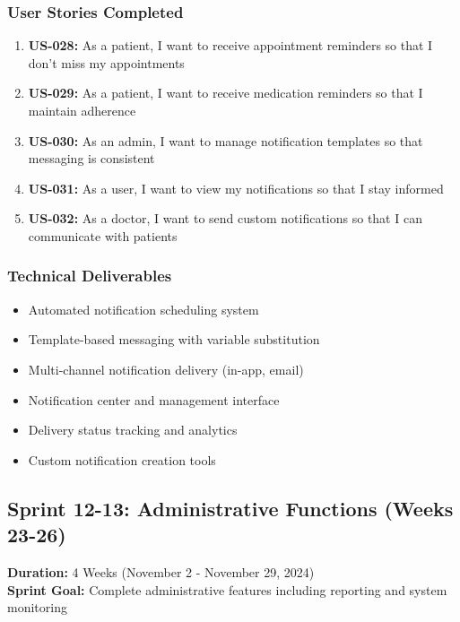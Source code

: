 \documentclass[12pt,a4paper]{article}
\begin{document}
\subsubsection{User Stories Completed}
\begin{enumerate}
    \item \textbf{US-028:} As a patient, I want to receive appointment reminders so that I don't miss my appointments
    \item \textbf{US-029:} As a patient, I want to receive medication reminders so that I maintain adherence
    \item \textbf{US-030:} As an admin, I want to manage notification templates so that messaging is consistent
    \item \textbf{US-031:} As a user, I want to view my notifications so that I stay informed
    \item \textbf{US-032:} As a doctor, I want to send custom notifications so that I can communicate with patients
\end{enumerate}

\subsubsection{Technical Deliverables}
\begin{itemize}
    \item Automated notification scheduling system
    \item Template-based messaging with variable substitution
    \item Multi-channel notification delivery (in-app, email)
    \item Notification center and management interface
    \item Delivery status tracking and analytics
    \item Custom notification creation tools
\end{itemize}

\subsection{Sprint 12-13: Administrative Functions (Weeks 23-26)}
\textbf{Duration:} 4 Weeks (November 2 - November 29, 2024) \\
\textbf{Sprint Goal:} Complete administrative features including reporting and system monitoring
\end{document}
